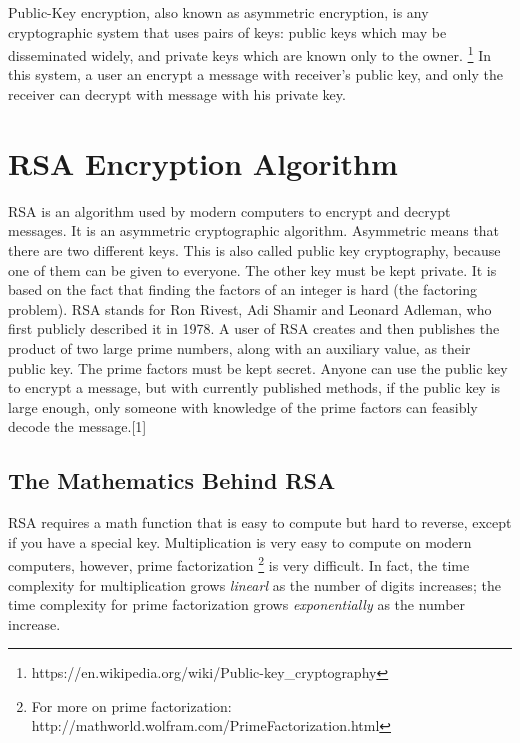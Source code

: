 \documentclass[]{article}
\begin{document}
Public-Key encryption, also known as asymmetric encryption, is any cryptographic system that uses pairs of keys: public keys which may be disseminated widely, and private keys which are known only to the owner. \footnote{https://en.wikipedia.org/wiki/Public-key\_cryptography} In this system, a user an encrypt a message with receiver's public key, and only the receiver can decrypt with message with his private key. 
\section{RSA Encryption Algorithm}
RSA is an algorithm used by modern computers to encrypt and decrypt messages. It is an asymmetric cryptographic algorithm. Asymmetric means that there are two different keys. This is also called public key cryptography, because one of them can be given to everyone. The other key must be kept private. It is based on the fact that finding the factors of an integer is hard (the factoring problem). RSA stands for Ron Rivest, Adi Shamir and Leonard Adleman, who first publicly described it in 1978. A user of RSA creates and then publishes the product of two large prime numbers, along with an auxiliary value, as their public key. The prime factors must be kept secret. Anyone can use the public key to encrypt a message, but with currently published methods, if the public key is large enough, only someone with knowledge of the prime factors can feasibly decode the message.[1]


\subsection{The Mathematics Behind RSA}

RSA requires a math function that is easy to compute but hard to reverse, except if you have a special key. Multiplication is very easy to compute on modern computers, however, prime factorization \footnote{For more on prime factorization: http://mathworld.wolfram.com/PrimeFactorization.html} is very difficult. In fact, the time complexity for multiplication grows \textit{linearl}  as the number of digits increases; the time complexity for prime factorization grows \textit{exponentially} as the number increase. 
\end{document}
